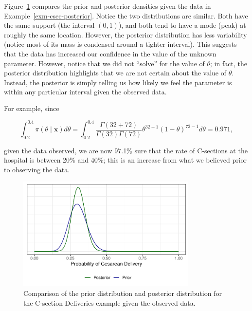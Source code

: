 \documentclass[
  letterpaper,
  DIV=11,
  numbers=noendperiod]{scrreprt}
\theoremstyle{definition}
\theoremstyle{definition}
\theoremstyle{plain}
\theoremstyle{remark}
\begin{document}
Figure~\ref{fig-csec-comparison} compares the prior and posterior
densities given the data in Example~\ref{exm-csec-posterior}. Notice the
two distributions are similar. Both have the same support (the interval
\((0, 1)\)), and both tend to have a mode (peak) at roughly the same
location. However, the posterior distribution has less variability
(notice most of its mass is condensed around a tighter interval). This
suggests that the data has increased our confidence in the value of the
unknown parameter. However, notice that we did not ``solve'' for the
value of \(\theta\); in fact, the posterior distribution highlights that
we are not certain about the value of \(\theta\). Instead, the posterior
is simply telling us how likely we feel the parameter is within any
particular interval given the observed data.

For example, since

\[\int_{0.2}^{0.4} \pi(\theta \mid \mathbf{x}) d\theta = \int_{0.2}^{0.4} \frac{\Gamma(32 + 72)}{\Gamma(32)\Gamma(72)} \theta^{32 - 1} (1 - \theta)^{72 - 1} d\theta = 0.971,\]

given the data observed, we are now 97.1\% sure that the rate of
C-sections at the hospital is between 20\% and 40\%; this is an increase
from what we believed prior to observing the data.

\begin{figure}

{\centering \includegraphics[width=0.8\textwidth,height=\textheight]{./images/fig-csec-comparison-1.pdf}

}

\caption{\label{fig-csec-comparison}Comparison of the prior distribution
and posterior distribution for the C-section Deliveries example given
the observed data.}

\end{figure}
\end{document}

